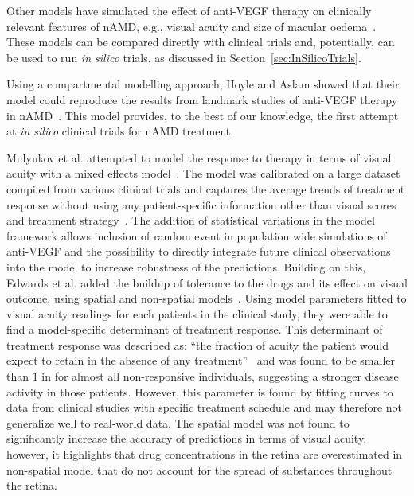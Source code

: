 \documentclass{article}
\begin{document}
Other models have simulated the effect of anti-VEGF therapy on clinically relevant features of nAMD, e.g., visual acuity and size of macular oedema~\cite{Edwards_2020, Hoyle_2017, Mulyukov_2018}.
These models can be compared directly with clinical trials and, potentially, can be used to run \textit{in silico} trials, as discussed in Section~\ref{sec:InSilicoTrials}.

Using a compartmental modelling approach, Hoyle and Aslam showed that their model could reproduce the results from landmark studies of anti-VEGF therapy in nAMD~\cite{Hoyle_2017}.
This model provides, to the best of our knowledge, the first attempt at \textit{in silico} clinical trials for nAMD treatment. 

Mulyukov et al. attempted to model the response to therapy in terms of visual acuity with a mixed effects model~\cite{Mulyukov_2018}.
The model was calibrated on a large dataset compiled from various clinical trials and captures the average trends of treatment response without using any patient-specific information other than visual scores and treatment strategy~\cite{Mulyukov_2018}.
The addition of statistical variations in the model framework allows inclusion of random event in population wide simulations of anti-VEGF and the possibility to directly integrate future clinical observations into the model to increase robustness of the predictions.
Building on this, Edwards et al. added the buildup of tolerance to the drugs and its effect on visual outcome, using spatial and non-spatial models~\cite{Edwards_2020}.
Using model parameters fitted to visual acuity readings for each patients in the clinical study, they were able to find a model-specific determinant of treatment response.
This determinant of treatment response was described as: ``the fraction of acuity the patient would expect to retain in the absence of any treatment''~\cite{Edwards_2020} and was found to be smaller than $1$ in for almost all non-responsive individuals, suggesting a stronger disease activity in those patients.
However, this parameter is found by fitting curves to data from clinical studies with specific treatment schedule and may therefore not generalize well to real-world data.
The spatial model was not found to significantly increase the accuracy of predictions in terms of visual acuity, however, it highlights that drug concentrations in the retina are overestimated in non-spatial model that do not account for the spread of substances throughout the retina. 
\end{document}

